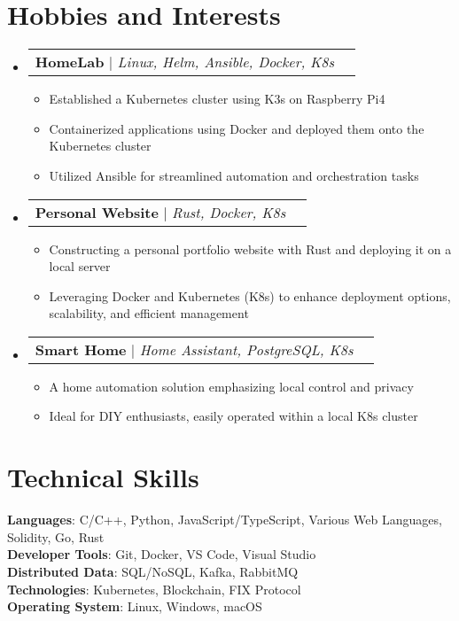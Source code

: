 \documentclass[letterpaper,11pt]{article}
\makeatletter
\newcommand{\resumeItem}[1]{
  \item\small{
    {#1 \vspace{-2pt}}
  }
}
\newcommand{\resumeProjectHeading}[2]{
    \item
    \begin{tabular*}{0.97\textwidth}{l@{\extracolsep{\fill}}r}
      \small#1 & #2 \\
    \end{tabular*}\vspace{-7pt}
}
\newcommand{\resumeSubHeadingListStart}{\begin{itemize}[leftmargin=0.15in, label={}]}
\newcommand{\resumeSubHeadingListEnd}{\end{itemize}}
\newcommand{\resumeItemListStart}{\begin{itemize}}
\newcommand{\resumeItemListEnd}{\end{itemize}\vspace{-5pt}}
\makeatother
\begin{document}
\section{Hobbies and Interests}
    \resumeSubHeadingListStart
      \resumeProjectHeading
          {\textbf{HomeLab} $|$ \emph{Linux, Helm, Ansible, Docker, K8s}}{}
          \resumeItemListStart
            \resumeItem{Established a Kubernetes cluster using K3s on Raspberry Pi4}
            \resumeItem{Containerized applications using Docker and deployed them onto the Kubernetes cluster}
            \resumeItem{Utilized Ansible for streamlined automation and orchestration tasks}
          \resumeItemListEnd
      \resumeProjectHeading
          {\textbf{Personal Website} $|$ \emph{Rust, Docker, K8s}}{}
          \resumeItemListStart
            \resumeItem{Constructing a personal portfolio website with Rust and deploying it on a local server}
            \resumeItem{Leveraging Docker and Kubernetes (K8s) to enhance deployment options, scalability, and efficient management}
          \resumeItemListEnd
      \resumeProjectHeading
          {\textbf{Smart Home} $|$ \emph{Home Assistant, PostgreSQL, K8s}}{}
          \resumeItemListStart
            \resumeItem{A home automation solution emphasizing local control and privacy}
            \resumeItem{Ideal for DIY enthusiasts, easily operated within a local K8s cluster}
          \resumeItemListEnd
    \resumeSubHeadingListEnd

\section{Technical Skills}
 \begin{itemize}[leftmargin=0.15in, label={}]
    \small{\item{
     \textbf{Languages}{: C/C++, Python, JavaScript/TypeScript, Various Web Languages, Solidity, Go, Rust} \\
     \textbf{Developer Tools}{: Git, Docker, VS Code, Visual Studio} \\
     \textbf{Distributed Data}{: SQL/NoSQL, Kafka, RabbitMQ} \\
     \textbf{Technologies}{: Kubernetes, Blockchain, FIX Protocol} \\
     \textbf{Operating System}{: Linux, Windows, macOS}
     }}
 \end{itemize}

\end{document}
